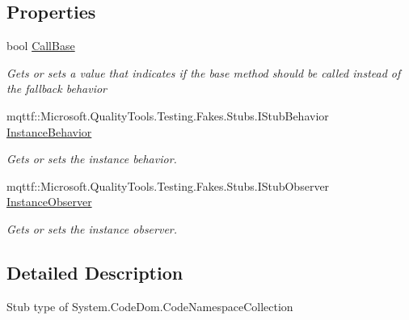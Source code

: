\subsection*{Properties}
\begin{DoxyCompactItemize}
\item 
bool \hyperlink{class_system_1_1_code_dom_1_1_fakes_1_1_stub_code_namespace_collection_a1edb4f4e89744357266c359a9c3829a8}{Call\-Base}
\begin{DoxyCompactList}\small\item\em Gets or sets a value that indicates if the base method should be called instead of the fallback behavior\end{DoxyCompactList}\item 
mqttf\-::\-Microsoft.\-Quality\-Tools.\-Testing.\-Fakes.\-Stubs.\-I\-Stub\-Behavior \hyperlink{class_system_1_1_code_dom_1_1_fakes_1_1_stub_code_namespace_collection_a19a5c1f5065a3e086c536ee91b4ebc1b}{Instance\-Behavior}
\begin{DoxyCompactList}\small\item\em Gets or sets the instance behavior.\end{DoxyCompactList}\item 
mqttf\-::\-Microsoft.\-Quality\-Tools.\-Testing.\-Fakes.\-Stubs.\-I\-Stub\-Observer \hyperlink{class_system_1_1_code_dom_1_1_fakes_1_1_stub_code_namespace_collection_a63eddedd009f9152228e3afd2e8f76be}{Instance\-Observer}
\begin{DoxyCompactList}\small\item\em Gets or sets the instance observer.\end{DoxyCompactList}\end{DoxyCompactItemize}


\subsection{Detailed Description}
Stub type of System.\-Code\-Dom.\-Code\-Namespace\-Collection



